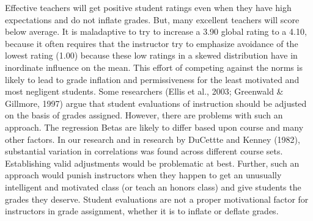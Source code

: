 \documentclass[man]{apa6}
\theoremstyle{definition}
\theoremstyle{definition}
\theoremstyle{definition}
\theoremstyle{remark}
\begin{document}
Effective teachers will get positive student ratings even when they have
high expectations and do not inflate grades. But, many excellent
teachers will score below average. It is maladaptive to try to increase
a 3.90 global rating to a 4.10, because it often requires that the
instructor try to emphasize avoidance of the lowest rating (1.00)
because these low ratings in a skewed distribution have in inordinate
influence on the mean. This effort of competing against the norms is
likely to lead to grade inflation and permissiveness for the least
motivated and most negligent students. Some researchers (Ellis et al.,
2003; Greenwald \& Gillmore, 1997) argue that student evaluations of
instruction should be adjusted on the basis of grades assigned. However,
there are problems with such an approach. The regression Betas are
likely to differ based upon course and many other factors. In our
research and in research by DuCettte and Kenney (1982), substantial
variation in correlations was found across different course sets.
Establishing valid adjustments would be problematic at best. Further,
such an approach would punish instructors when they happen to get an
unusually intelligent and motivated class (or teach an honors class) and
give students the grades they deserve. Student evaluations are not a
proper motivational factor for instructors in grade assignment, whether
it is to inflate or deflate grades.
\end{document}
